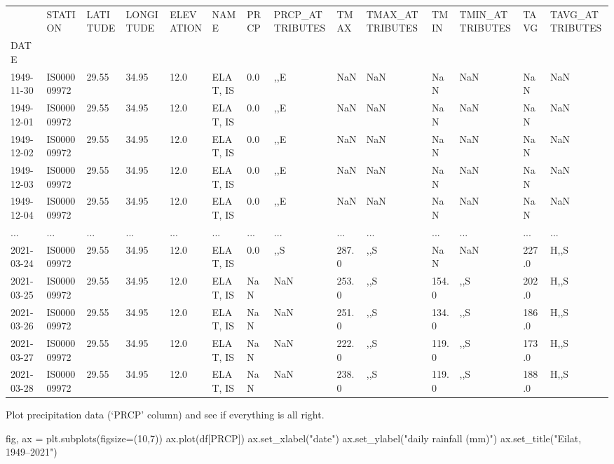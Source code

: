 \documentclass[
  letterpaper,
  DIV=11,
  numbers=noendperiod]{scrreprt}
\newenvironment{Shaded}{\begin{snugshade}}{\end{snugshade}}
\newcommand{\DecValTok}[1]{\textcolor[rgb]{0.68,0.00,0.00}{#1}}
\newcommand{\NormalTok}[1]{\textcolor[rgb]{0.00,0.23,0.31}{#1}}
\newcommand{\OperatorTok}[1]{\textcolor[rgb]{0.37,0.37,0.37}{#1}}
\newcommand{\StringTok}[1]{\textcolor[rgb]{0.13,0.47,0.30}{#1}}
\begin{document}
\begin{longtable}[]{@{}llllllllllllll@{}}
\toprule()
& STATION & LATITUDE & LONGITUDE & ELEVATION & NAME & PRCP &
PRCP\_ATTRIBUTES & TMAX & TMAX\_ATTRIBUTES & TMIN & TMIN\_ATTRIBUTES &
TAVG & TAVG\_ATTRIBUTES \\
DATE & & & & & & & & & & & & & \\
\midrule()
\endhead
1949-11-30 & IS000009972 & 29.55 & 34.95 & 12.0 & ELAT, IS & 0.0 & ,,E &
NaN & NaN & NaN & NaN & NaN & NaN \\
1949-12-01 & IS000009972 & 29.55 & 34.95 & 12.0 & ELAT, IS & 0.0 & ,,E &
NaN & NaN & NaN & NaN & NaN & NaN \\
1949-12-02 & IS000009972 & 29.55 & 34.95 & 12.0 & ELAT, IS & 0.0 & ,,E &
NaN & NaN & NaN & NaN & NaN & NaN \\
1949-12-03 & IS000009972 & 29.55 & 34.95 & 12.0 & ELAT, IS & 0.0 & ,,E &
NaN & NaN & NaN & NaN & NaN & NaN \\
1949-12-04 & IS000009972 & 29.55 & 34.95 & 12.0 & ELAT, IS & 0.0 & ,,E &
NaN & NaN & NaN & NaN & NaN & NaN \\
... & ... & ... & ... & ... & ... & ... & ... & ... & ... & ... & ... &
... & ... \\
2021-03-24 & IS000009972 & 29.55 & 34.95 & 12.0 & ELAT, IS & 0.0 & ,,S &
287.0 & ,,S & NaN & NaN & 227.0 & H,,S \\
2021-03-25 & IS000009972 & 29.55 & 34.95 & 12.0 & ELAT, IS & NaN & NaN &
253.0 & ,,S & 154.0 & ,,S & 202.0 & H,,S \\
2021-03-26 & IS000009972 & 29.55 & 34.95 & 12.0 & ELAT, IS & NaN & NaN &
251.0 & ,,S & 134.0 & ,,S & 186.0 & H,,S \\
2021-03-27 & IS000009972 & 29.55 & 34.95 & 12.0 & ELAT, IS & NaN & NaN &
222.0 & ,,S & 119.0 & ,,S & 173.0 & H,,S \\
2021-03-28 & IS000009972 & 29.55 & 34.95 & 12.0 & ELAT, IS & NaN & NaN &
238.0 & ,,S & 119.0 & ,,S & 188.0 & H,,S \\
\bottomrule()
\end{longtable}

Plot precipitation data (`PRCP' column) and see if everything is all
right.

\begin{Shaded}
\begin{Highlighting}[]
\NormalTok{fig, ax }\OperatorTok{=}\NormalTok{ plt.subplots(figsize}\OperatorTok{=}\NormalTok{(}\DecValTok{10}\NormalTok{,}\DecValTok{7}\NormalTok{))}
\NormalTok{ax.plot(df[}\StringTok{\textquotesingle{}PRCP\textquotesingle{}}\NormalTok{])}
\NormalTok{ax.set\_xlabel(}\StringTok{"date"}\NormalTok{)}
\NormalTok{ax.set\_ylabel(}\StringTok{"daily rainfall (mm)"}\NormalTok{)}
\NormalTok{ax.set\_title(}\StringTok{"Eilat, 1949–2021"}\NormalTok{)}
\end{Highlighting}
\end{Shaded}
\end{document}
